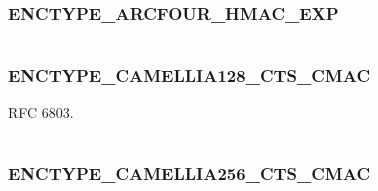 \documentclass[letterpaper,10pt,english]{sphinxmanual}
\begin{document}
\subsubsection{ENCTYPE\_ARCFOUR\_HMAC\_EXP}
\label{appdev/refs/macros/ENCTYPE_ARCFOUR_HMAC_EXP:enctype-arcfour-hmac-exp-data}\label{appdev/refs/macros/ENCTYPE_ARCFOUR_HMAC_EXP:enctype-arcfour-hmac-exp}\label{appdev/refs/macros/ENCTYPE_ARCFOUR_HMAC_EXP::doc}

\begin{fulllineitems}
\label{appdev/refs/macros/ENCTYPE_ARCFOUR_HMAC_EXP:ENCTYPE_ARCFOUR_HMAC_EXP}
\end{fulllineitems}


\begin{tabulary}{\linewidth}{|L|L|}
\hline

 & 
\\\hline
\end{tabulary}



\subsubsection{ENCTYPE\_CAMELLIA128\_CTS\_CMAC}
\label{appdev/refs/macros/ENCTYPE_CAMELLIA128_CTS_CMAC:enctype-camellia128-cts-cmac-data}\label{appdev/refs/macros/ENCTYPE_CAMELLIA128_CTS_CMAC:enctype-camellia128-cts-cmac}\label{appdev/refs/macros/ENCTYPE_CAMELLIA128_CTS_CMAC::doc}

\begin{fulllineitems}
\label{appdev/refs/macros/ENCTYPE_CAMELLIA128_CTS_CMAC:ENCTYPE_CAMELLIA128_CTS_CMAC}
\end{fulllineitems}


RFC 6803.

\begin{tabulary}{\linewidth}{|L|L|}
\hline

 & 
\\\hline
\end{tabulary}



\subsubsection{ENCTYPE\_CAMELLIA256\_CTS\_CMAC}
\label{appdev/refs/macros/ENCTYPE_CAMELLIA256_CTS_CMAC:enctype-camellia256-cts-cmac-data}\label{appdev/refs/macros/ENCTYPE_CAMELLIA256_CTS_CMAC:enctype-camellia256-cts-cmac}\label{appdev/refs/macros/ENCTYPE_CAMELLIA256_CTS_CMAC::doc}
\end{document}
